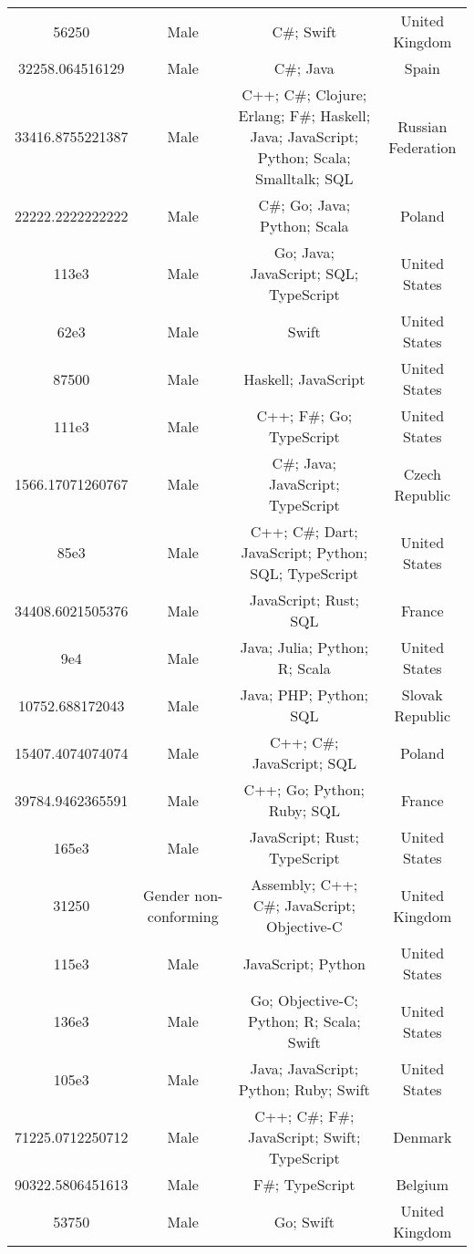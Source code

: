 \begin{center}
\begin{tabular}{ |c|c|c|c| }
56250  &  Male  &  C\#; Swift  &  United Kingdom  \\ 
32258.064516129  &  Male  &  C\#; Java  &  Spain  \\ 
33416.8755221387  &  Male  &  C++; C\#; Clojure; Erlang; F\#; Haskell; Java; JavaScript; Python; Scala; Smalltalk; SQL  &  Russian Federation  \\ 
22222.2222222222  &  Male  &  C\#; Go; Java; Python; Scala  &  Poland  \\ 
113e3  &  Male  &  Go; Java; JavaScript; SQL; TypeScript  &  United States  \\ 
62e3  &  Male  &  Swift  &  United States  \\ 
87500  &  Male  &  Haskell; JavaScript  &  United States  \\ 
111e3  &  Male  &  C++; F\#; Go; TypeScript  &  United States  \\ 
1566.17071260767  &  Male  &  C\#; Java; JavaScript; TypeScript  &  Czech Republic  \\ 
85e3  &  Male  &  C++; C\#; Dart; JavaScript; Python; SQL; TypeScript  &  United States  \\ 
34408.6021505376  &  Male  &  JavaScript; Rust; SQL  &  France  \\ 
9e4  &  Male  &  Java; Julia; Python; R; Scala  &  United States  \\ 
10752.688172043  &  Male  &  Java; PHP; Python; SQL  &  Slovak Republic  \\ 
15407.4074074074  &  Male  &  C++; C\#; JavaScript; SQL  &  Poland  \\ 
39784.9462365591  &  Male  &  C++; Go; Python; Ruby; SQL  &  France  \\ 
165e3  &  Male  &  JavaScript; Rust; TypeScript  &  United States  \\ 
31250  &  Gender non-conforming  &  Assembly; C++; C\#; JavaScript; Objective-C  &  United Kingdom  \\ 
115e3  &  Male  &  JavaScript; Python  &  United States  \\ 
136e3  &  Male  &  Go; Objective-C; Python; R; Scala; Swift  &  United States  \\ 
105e3  &  Male  &  Java; JavaScript; Python; Ruby; Swift  &  United States  \\ 
71225.0712250712  &  Male  &  C++; C\#; F\#; JavaScript; Swift; TypeScript  &  Denmark  \\ 
90322.5806451613  &  Male  &  F\#; TypeScript  &  Belgium  \\ 
53750  &  Male  &  Go; Swift  &  United Kingdom  \\ 

\end{tabular}
\end{center}
